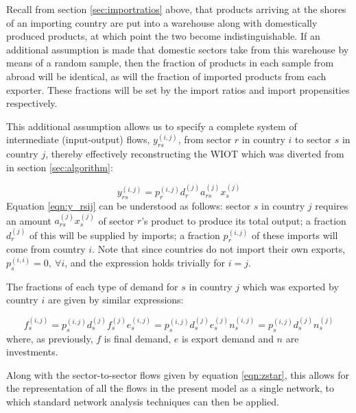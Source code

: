 \documentclass[a4paper]{article}
\begin{document}
Recall from section \ref{sec:importratios} above, that products arriving at the shores of an importing country are put into a warehouse along with domestically produced products, at which point the two become indistinguishable.
If an additional assumption is made that domestic sectors take from this warehouse by means of a random sample, then the fraction of products in each sample from abroad will be identical, as will the fraction of imported products from each exporter.
These fractions will be set by the import ratios and import propensities respectively.

This additional assumption allows us to specify a complete system of intermediate (input-output) flows, $y_{rs}^{(i,j)}$, from sector $r$ in country $i$ to sector $s$ in country $j$, thereby effectively reconstructing the WIOT which was diverted from in section \ref{sec:algorithm}:

\begin{equation}\label{eqn:y_rsij}
y_{rs}^{(i,j)} = p_{r}^{(i,j)} d_{r}^{(j)} a_{rs}^{(j)} x_{s}^{(j)}
\end{equation}
Equation \eqref{eqn:y_rsij} can be understood as follows:
sector $s$ in country $j$ requires an amount $a_{rs}^{(j)} x_{s}^{(j)}$ of sector $r$'s product to produce its total output;
a fraction $d_{r}^{(j)}$ of this will be supplied by imports;
a fraction $p_{r}^{(i,j)}$ of these imports will come from country $i$. Note that since countries do not import their own exports, $p_s^{(i,i)}=0,\ \forall i$, and the expression holds trivially for $i=j$.

The fractions of each type of demand for $s$ in country $j$ which was exported by country $i$ are given by similar expressions:

\begin{subequations}
\begin{equation}\label{eqn:f_sij}
f_{s}^{(i,j)} = p_{s}^{(i,j)} d_{s}^{(j)} f_{s}^{(j)}
\end{equation}
\begin{equation}\label{eqn:e_sij}
e_{s}^{(i,j)} = p_{s}^{(i,j)} d_{s}^{(j)} e_{s}^{(j)}
\end{equation}
\begin{equation}\label{eqn:n_sij}
n_{s}^{(i,j)} = p_{s}^{(i,j)} d_{s}^{(j)} n_{s}^{(j)}
\end{equation}
\end{subequations}
where, as previously, $f$ is final demand, $e$ is export demand and $n$ are investments.

Along with the sector-to-sector flows given by equation \eqref{eqn:zstar}, this allows for the representation of all the flows in the present model as a single network, to which standard network analysis techniques can then be applied.
\end{document}
